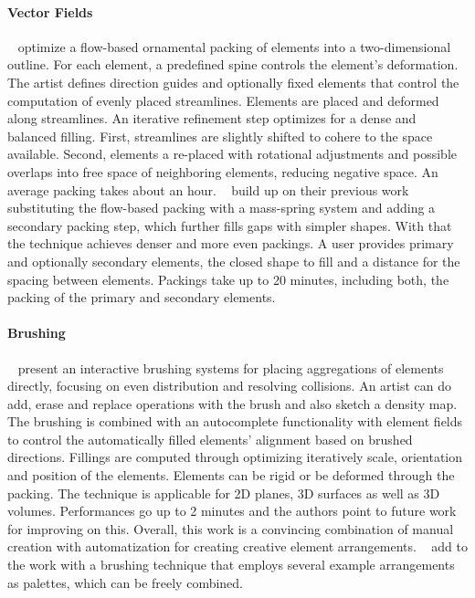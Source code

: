 \paragraph*{Vector Fields}
\label{para:analysis_element_arrangements_vector}

\citeauthor*{saputra_2017_ffo}~\cite{saputra_2017_ffo} optimize a flow-based ornamental packing of elements into a two-dimensional outline. For each element, a predefined spine controls the element's deformation. The artist defines direction guides and optionally fixed elements that control the computation of evenly placed streamlines. Elements are placed and deformed along streamlines. An iterative refinement step optimizes for a dense and balanced filling. First, streamlines are slightly shifted to cohere to the space available. Second, elements a re-placed with rotational adjustments and possible overlaps into free space of neighboring elements, reducing negative space. An average packing takes about an hour. \citeauthor*{saputra_2018_rde}~\cite{saputra_2018_rde} build up on their previous work substituting the flow-based packing with a mass-spring system and adding a secondary packing step, which further fills gaps with simpler shapes. With that the technique achieves denser and more even packings. A user provides primary and optionally secondary elements, the closed shape to fill and a distance for the spacing between elements. Packings take up to 20 minutes, including both, the packing of the primary and secondary elements.


\paragraph*{Brushing}
\label{para:analysis_element_arrangements_sketching}
\citeauthor*{hsu_2020_aef}~\cite{hsu_2020_aef} present an interactive brushing systems for placing aggregations of elements directly, focusing on even distribution and resolving collisions. An artist can do add, erase and replace operations with the brush and also sketch a density map. The brushing is combined with an autocomplete functionality with element fields to control the automatically filled elements' alignment based on brushed directions. Fillings are computed through optimizing iteratively scale, orientation and position of the elements. Elements can be rigid or be deformed through the packing. The technique is applicable for 2D planes, 3D surfaces as well as 3D volumes. Performances go up to 2 minutes and the authors point to future work for improving on this. Overall, this work is a convincing combination of manual creation with automatization for creating creative element arrangements. \citeauthor*{davison_2019_ief}~\cite{davison_2019_ief} add to the work with a brushing technique that employs several example arrangements as palettes, which can be freely combined. 


